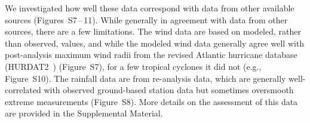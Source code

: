 We investigated how well these data correspond with data from other available
sources (Figures~S7\,--\,11).  While generally in agreement with data from other
sources, there are a few limitations. The wind data are based on modeled,
rather than observed, values, and while the modeled wind data generally agree
well with post-analysis maximum wind radii from the revised Atlantic hurricane
database (\ac{HURDAT2}~\citep{landsea2013}) (Figure~S7), for a few tropical cyclones
it did not (e.g., Figure~S10). The rainfall data are from re-analysis data,
which are generally well-correlated with observed ground-based station data but
sometimes oversmooth extreme measurements (Figure~S8). More details on the assessment
of this data are provided in the Supplemental Material. 
